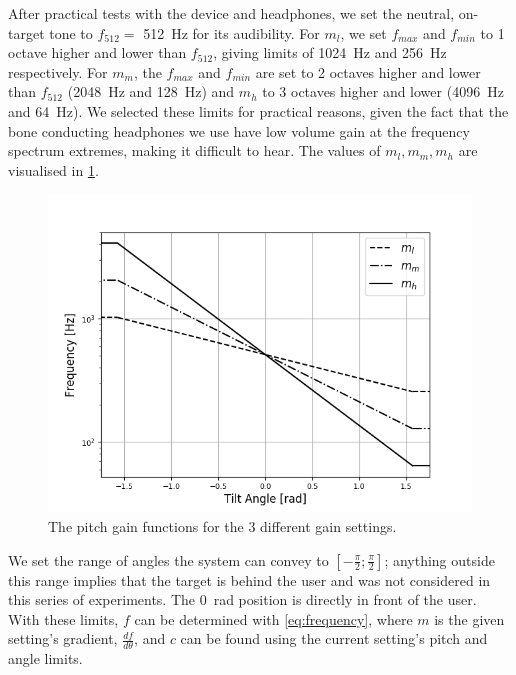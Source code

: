 \documentclass[sigconf, screen=true, anonymous=true]{acmart}
\begin{document}
After practical tests with the device and headphones, we set the neutral, on-target tone to $f_{512} =$ \SI{512}{\hertz} for its audibility.
For $m_l$, we set $f_{max}$ and $f_{min}$ to 1 octave higher and lower than $f_{512}$, giving limits of \SI{1024}{\hertz} and \SI{256}{\hertz} respectively.
For $m_m$, the $f_{max}$ and $f_{min}$ are set to 2 octaves higher and lower than $f_{512}$ (\SI{2048}{\hertz} and \SI{128}{\hertz}) and $m_h$ to 3 octaves higher and lower (\SI{4096}{\hertz} and \SI{64}{\hertz}).
We selected these limits for practical reasons, given the fact that the bone conducting headphones we use have low volume gain at the frequency spectrum extremes, making it difficult to hear. 
The values of $m_l, m_m, m_h$ are visualised in \cref{fig:pitch-gain}.

\begin{figure}
  \centering
  \includegraphics[width=1.0\columnwidth]{figures/pitch_gain_functions.png}
  \caption{The pitch gain functions for the 3 different gain settings. }\label{fig:pitch-gain}
\end{figure}

We set the range of angles the system can convey to $[-\frac{\pi}{2}; \frac{\pi}{2}]$; anything outside this range implies that the target is behind the user and was not considered in this series of experiments. 
The \SI{0}{\radian} position is directly in front of the user.
With these limits, $f$ can be determined with \cref{eq:frequency}, where $m$ is the given setting's gradient, $\frac{df}{d\theta}$, and $c$ can be found using the current setting's pitch and angle limits.
\end{document}
